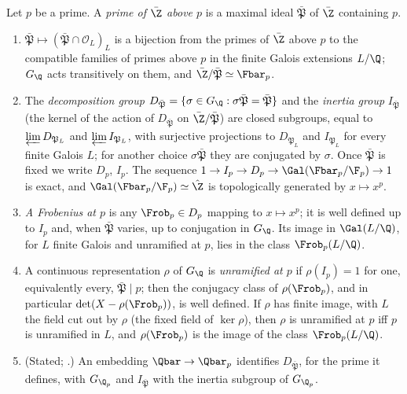 \begin{proposition}\label{prop:ant:frobGQ}
Let $p$ be a prime. A \emph{prime of $\bar\Z$ above $p$} is a maximal ideal $\bar{\mathfrak P}$ of $\bar\Z$ containing $p$.
\begin{enumerate}[label=(\roman*)]
\item $\bar{\mathfrak P}\mapsto(\bar{\mathfrak P}\cap\mathcal O_L)_L$ is a bijection from the primes of $\bar\Z$ above $p$ to the compatible families of primes
above $p$ in the finite Galois extensions $L/\Q$; $G_\Q$ acts transitively on them, and $\bar\Z/\bar{\mathfrak P}\simeq\Fbar_p$.
\item The \emph{decomposition group} $D_{\bar{\mathfrak P}}=\{\sigma\in G_\Q:\sigma\bar{\mathfrak P}=\bar{\mathfrak P}\}$ and the \emph{inertia group}
$I_{\bar{\mathfrak P}}$ (the kernel of the action of $D_{\bar{\mathfrak P}}$ on $\bar\Z/\bar{\mathfrak P}$) are closed subgroups, equal to
$\varprojlim D_{\mathfrak P_L}$ and $\varprojlim I_{\mathfrak P_L}$, with surjective projections to $D_{\mathfrak P_L}$ and $I_{\mathfrak P_L}$ for every finite
Galois $L$; for another choice $\sigma\bar{\mathfrak P}$ they are conjugated by $\sigma$. Once $\bar{\mathfrak P}$ is fixed we write $D_p$, $I_p$. The
sequence $1\to I_p\to D_p\to\Gal(\Fbar_p/\F_p)\to1$ is exact, and $\Gal(\Fbar_p/\F_p)\simeq\hat\Z$ is topologically generated by $x\mapsto x^p$.
\item \emph{A Frobenius at $p$} is any $\Frob_p\in D_p$ mapping to $x\mapsto x^p$; it is well defined up to $I_p$ and, when $\bar{\mathfrak P}$ varies, up
to conjugation in $G_\Q$. Its image in $\Gal(L/\Q)$, for $L$ finite Galois and unramified at $p$, lies in the class $\Frob_p(L/\Q)$.
\item A continuous representation $\rho$ of $G_\Q$ is \emph{unramified at $p$} if $\rho(I_p)=1$ for one, equivalently every, $\bar{\mathfrak P}\mid p$; then
the conjugacy class of $\rho(\Frob_p)$, and in particular $\det(X-\rho(\Frob_p))$, is well defined. If $\rho$ has finite image, with $L$ the field cut
out by $\rho$ (the fixed field of $\ker\rho$), then $\rho$ is unramified at $p$ iff $p$ is unramified in $L$, and $\rho(\Frob_p)$ is the image of the
class $\Frob_p(L/\Q)$.
\item (Stated; .) An embedding $\Qbar\to\Qbar_p$ identifies $D_{\bar{\mathfrak P}}$, for the prime it defines, with $G_{\Q_p}$ and
$I_{\bar{\mathfrak P}}$ with the inertia subgroup of $G_{\Q_p}$.
\end{enumerate}
\end{proposition}

